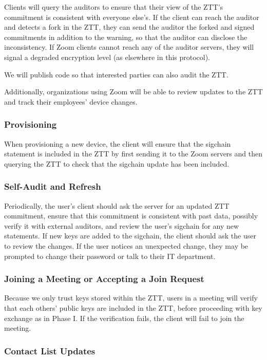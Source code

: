 Clients will query the auditors to ensure that their view of the ZTT's commitment is consistent with everyone else's. If the client can reach the auditor and detects a fork in the ZTT, they can send the auditor the forked and signed commitments in addition to the warning, so that the auditor can disclose the inconsistency. If Zoom clients cannot reach any of the auditor servers, they will signal a degraded encryption level (as elsewhere in this protocol).

We will publish code so that interested parties can also audit the ZTT.

Additionally, organizations using Zoom will be able to review updates to the ZTT and track their employees' device changes.

\subsubsection{Provisioning}

When provisioning a new device, the client will ensure that the sigchain statement is included in the ZTT by first sending it to the Zoom servers and then querying the ZTT to check that the sigchain update has been included.

\subsubsection{Self-Audit and Refresh}

Periodically, the user's client should ask the server for an updated ZTT commitment, ensure that this commitment is consistent with past data, possibly verify it with external auditors, and review the user's sigchain for any new statements. If new keys are added to the sigchain, the client should ask the user to review the changes. If the user notices an unexpected change, they may be prompted to change their password or talk to their IT department.

\subsubsection{Joining a Meeting or Accepting a Join Request}

Because we only trust keys stored within the ZTT, users in a meeting will verify that each others' public keys are included in the ZTT, before proceeding with key exchange as in Phase I. If the verification fails, the client will fail to join the meeting.

\subsubsection{Contact List Updates}

